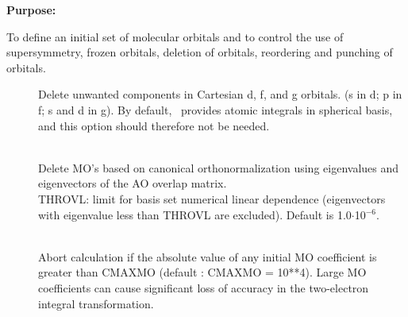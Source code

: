 {\bf Purpose:}

To define an initial set of molecular orbitals
and to control the use of supersymmetry, frozen
orbitals, deletion of orbitals,
reordering and punching of orbitals.

\begin{description}
\item[]
  Delete unwanted components in Cartesian d, f, and g orbitals.
  (s in d; p in f; s and d in g). By default, \her\ provides atomic
  integrals in spherical basis, and this option should therefore not
  be needed.

\item[]
   \\
  Delete MO's based on canonical orthonormalization using eigenvalues
  and eigenvectors of the AO overlap matrix. \\
  THROVL: limit for basis
  set numerical linear dependence (eigenvectors with eigenvalue less
  than THROVL are excluded). Default is 1.0$\cdot$10$^{-6}$.


\item[]
   \\
  Abort calculation if the absolute value of any initial MO coefficient is
  greater than CMAXMO (default : CMAXMO = 10**4).  Large MO coefficients
  can cause significant loss of accuracy in the two-electron integral
  transformation.


\end{description}
